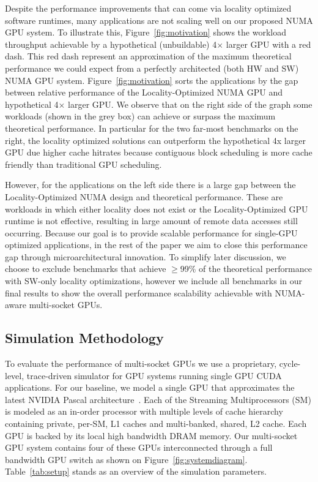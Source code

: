Despite the performance improvements that can come via locality optimized 
software runtimes, many applications are not scaling well on our proposed NUMA 
GPU system. To illustrate this, Figure~\ref{fig:motivation} shows the workload 
throughput achievable by a hypothetical (unbuildable) 4$\times$ larger GPU with 
a red dash. This red dash represent an approximation of the 
maximum theoretical performance we could expect from a perfectly architected 
(both HW and SW) NUMA GPU system. Figure~\ref{fig:motivation} sorts the 
applications by the gap between relative performance of the Locality-Optimized 
NUMA GPU and hypothetical 4$\times$ larger GPU. We observe that on the right 
side of the graph some workloads (shown in the grey box) can achieve or surpass 
the maximum theoretical performance. In particular for the two far-most 
benchmarks on the right, the locality optimized solutions can outperform the 
hypothetical 4x larger GPU due higher cache hitrates because contiguous block 
scheduling is more cache friendly than traditional GPU scheduling.

However, for the applications on the left side there is a large gap between the 
Locality-Optimized NUMA design and theoretical performance. These are workloads 
in which either locality does not exist or the Locality-Optimized GPU runtime is 
not effective, resulting in large amount of remote data accesses still 
occurring.  Because our goal is to provide scalable performance for single-GPU 
optimized applications, in the rest of the paper we aim to close this 
performance gap through microarchitectural innovation. To simplify later 
discussion, we choose to exclude benchmarks that achieve $\geq$99\% of the 
theoretical performance with SW-only locality optimizations, however we include 
all benchmarks in our final results to show the overall performance scalability 
achievable with NUMA-aware multi-socket GPUs.
 
\subsection{Simulation Methodology}
\label{sec:methodology}

To evaluate the performance of multi-socket GPUs we use a proprietary, 
cycle-level, trace-driven simulator for GPU systems running single GPU CUDA 
applications. For our baseline, we model a single GPU that approximates the 
latest NVIDIA Pascal architecture~\cite{pascal-tesla-wp}. Each of the 
Streaming Multiprocessors (SM) is modeled as an in-order processor with 
multiple levels of cache hierarchy containing private, per-SM, L1 caches and 
multi-banked, shared, L2 cache. Each GPU is backed by its local high 
bandwidth DRAM memory. Our multi-socket GPU system contains four of these 
GPUs interconnected through a full bandwidth GPU switch as shown on 
Figure~\ref{fig:systemdiagram}. Table~\ref{tab:setup} stands as an overview 
of the simulation parameters.

